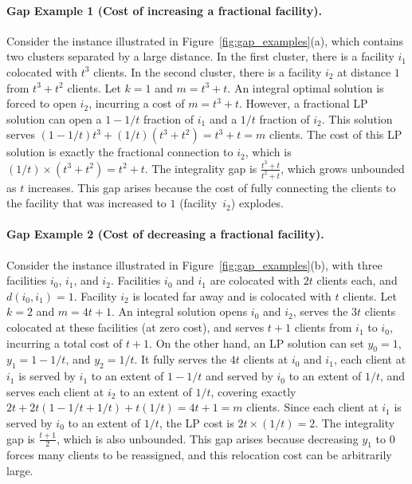 \paragraph{Gap Example 1 (Cost of increasing a fractional facility).}
Consider the instance illustrated in Figure~\ref{fig:gap_examples}(a), which contains two clusters separated by a large distance. In the first cluster, there is a facility $i_1$ colocated with $t^3$ clients. In the second cluster, there is a facility $i_2$ at distance $1$ from $t^3 + t^2$ clients. Let $k = 1$ and $m = t^3 + t$. An integral optimal solution is forced to open $i_2$, incurring a cost of $m = t^3 + t$. However, a fractional LP solution can open a $1-1/t$ fraction of $i_1$ and a $1/t$ fraction of $i_2$. This solution serves $(1-1/t)t^3 + (1/t)(t^3+t^2) = t^3 + t = m$ clients. The cost of this LP solution is exactly the fractional connection to $i_2$, which is $(1/t) \times (t^3+t^2) = t^2+t$. The integrality gap is $\frac{t^3+t}{t^2+t}$, which grows unbounded as $t$ increases. This gap arises because the cost of fully connecting the clients to the facility that was increased to $1$ (facility~$i_2$) explodes.

\paragraph{Gap Example 2 (Cost of decreasing a fractional facility).}
Consider the instance illustrated in Figure~\ref{fig:gap_examples}(b), with three facilities $i_0$, $i_1$, and $i_2$. Facilities $i_0$ and $i_1$ are colocated with $2t$ clients each, and $d(i_0, i_1) = 1$. Facility $i_2$ is located far away and is colocated with $t$ clients. Let $k = 2$ and $m = 4t + 1$. An integral solution opens $i_0$ and $i_2$, serves the $3t$ clients colocated at these facilities (at zero cost), and serves $t+1$ clients from $i_1$ to $i_0$, incurring a total cost of $t+1$. On the other hand, an LP solution can set $y_0 = 1$, $y_1 = 1-1/t$, and $y_2 = 1/t$. It fully serves the $4t$ clients at $i_0$ and $i_1$, each client at $i_1$ is served by $i_1$ to an extent of $1 - 1/t$ and served by $i_0$ to an extent of $1/t$, and serves each client at $i_2$ to an extent of $1/t$, covering exactly $2t + 2t(1- 1/t + 1/t)+ t(1/t) = 4t+1 = m$ clients. Since each client at $i_1$ is served by $i_0$ to an extent of $1/t$, the LP cost is $2t \times (1/t) = 2$. The integrality gap is $\frac{t+1}{2}$, which is also unbounded. This gap arises because decreasing $y_1$ to $0$ forces many clients to be reassigned, and this relocation cost can be arbitrarily large.


